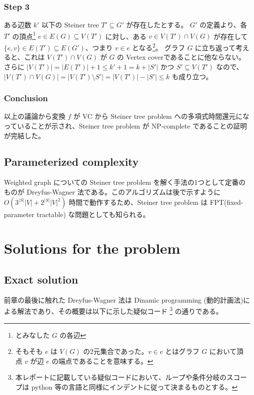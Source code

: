 \documentclass[12pt,uplatex,dvipdfmx,titlepage]{article}
\theoremstyle{case}
\begin{document}
    \subsubsection*{Step 3}
    ある辺数 $k'$ 以下の Steiner tree $T'\subseteq G'$ が存在したとする。
    $G'$ の定義より、各 $T'$ の頂点\footnote{とみなした $G$ の各辺} $e\in E(G) \subseteq V(T')$ に対し、ある $v\in V(T')\cap V(G)$ が存在して $\{e,v\}\in E(T')\subseteq E(G')$、つまり $v\in e$ となる\footnote{そもそも $e$ は $V(G)$ の2元集合であった。$v \in e$ とはグラフ $G$ において頂点 $v$ が辺 $e$ の端点であることを意味する。}。
    グラフ $G$ に立ち返って考えると、これは $V(T')\cap V(G)$ が $G$ の Vertex coverであることに他ならない。
    さらに $|V(T')|=|E(T')|+1\le k'+1=k+|S'| $ かつ $S'\subseteq V(T')$ なので、$|V(T')\cap V(G)|=|V(T')\setminus S'|=|V(T')|-|S'|\le k$ も成り立つ。

    \subsubsection*{Conclusion}
    以上の議論から変換 $f$ が VC から Steiner tree problem への多項式時間還元になっていることが示され、Steiner tree problem が NP-complete であることの証明が完結した。

    \subsection{Parameterized complexity}
    Weighted graph についての Steiner tree problem を解く手法の1つとして定番のものが Dreyfus-Wagner 法\cite{DW}である。このアルゴリズムは後で示すように $O(3^{|S|}|V|+2^{|S|}|V|^2)$ 時間で動作するため、Steiner tree problem は FPT(fixed-parameter tractable) な問題としても知られる。

    \section{Solutions for the problem}
    \subsection{Exact solution}
    前章の最後に触れた Dreyfus-Wagner 法\cite{DW}は Dinamic programming (動的計画法)による解法であり、その概要は以下に示した疑似コード
    \footnote{本レポートに記載している疑似コードにおいて、ループや条件分岐のスコープは python 等の言語と同様にインデントに従って決まるものとする。}
    の通りである。
\end{document}
